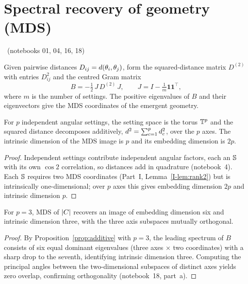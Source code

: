 \documentclass[11pt]{article}
\begin{document}
\section{Spectral recovery of geometry (MDS)}\label{sec:mds}
\established\ (notebooks 01, 04, 16, 18)

\begin{definition}\label{def:gram}
Given pairwise distances $D_{ij}=d(\theta_i,\theta_j)$, form the squared-distance
matrix $D^{(2)}$ with entries $D_{ij}^2$ and the centred Gram matrix
\begin{equation}
B=-\tfrac12\,J\,D^{(2)}\,J,\qquad J=I-\tfrac1m\mathbf{1}\mathbf{1}^{\top},
\label{eq:gram}
\end{equation}
where $m$ is the number of settings. The positive eigenvalues of $B$ and their
eigenvectors give the MDS coordinates of the emergent geometry.
\end{definition}

\begin{proposition}\label{prop:additive}
For $p$ independent angular settings, the setting space is the torus $\mathbb{T}^{p}$ and the
squared distance decomposes additively,
$d^2=\sum_{c=1}^{p}d_c^{2}$, over the $p$ axes. The intrinsic dimension of the MDS
image is $p$ and its embedding dimension is $2p$.
\end{proposition}

\begin{proof}
Independent settings contribute independent angular factors, each an $\mathbb{S}$ with its own
$\cos2$ correlation, so distances add in quadrature (notebook~4). Each $\mathbb{S}$ requires
two MDS coordinates (Part~I, Lemma~\ref{I-lem:rank2}) but is intrinsically one-dimensional;
over $p$ axes this gives embedding dimension $2p$ and intrinsic dimension $p$.
\end{proof}

\begin{proposition}\label{prop:t3}
For $p=3$, MDS of $|C|$ recovers an image of embedding dimension six and intrinsic
dimension three, with the three axis subspaces mutually orthogonal.
\end{proposition}

\begin{proof}
By Proposition~\ref{prop:additive} with $p=3$, the leading spectrum of $B$ consists of six
equal dominant eigenvalues (three axes $\times$ two coordinates) with a sharp drop to the
seventh, identifying intrinsic dimension three. Computing the principal angles between the
two-dimensional subspaces of distinct axes yields zero overlap, confirming orthogonality
(notebook~18, part~a).
\end{proof}
\end{document}
